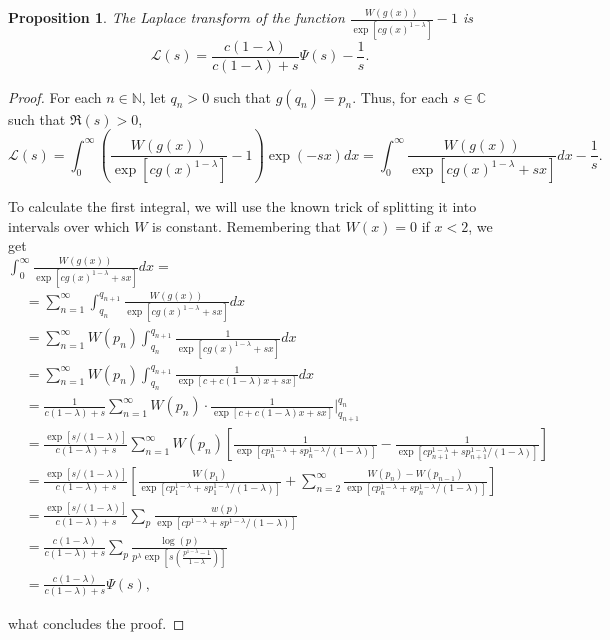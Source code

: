 \documentclass[11pt]{amsart}
\newtheorem{proposition}[theorem]{Proposition}
\numberwithin{equation}{section}
\newcommand{\N}{\mathbb{N}}
\newcommand{\C}{\mathbb{C}}
\newcommand{\disum}{\displaystyle \sum}
\newcommand{\diint}{\displaystyle \int}
\newcommand{\difrac}{\displaystyle \frac}
\begin{document}
\begin{proposition}

The Laplace transform of the function $\difrac{W(g(x))}{\exp[cg(x)^{1 - \lambda}]} -1$ is $$\mathscr{L}(s) = \difrac{c(1 - \lambda)}{c(1 - \lambda) + s}\Psi(s) - \difrac{1}{s}.$$

\end{proposition}

\begin{proof} For each $n \in \N$, let $q_n > 0$ such that $g(q_n) = p_n$. Thus, for each $s \in \C$ such that $\Re(s) > 0$, $$\mathscr{L}(s) = \diint_{0}^{\infty} \left(\difrac{W(g(x))}{\exp[cg(x)^{1 - \lambda}]} -1\right) \exp(-sx) dx = \diint_{0}^{\infty} \difrac{W(g(x))}{\exp[cg(x)^{1 - \lambda} + sx]} dx - \difrac{1}{s}.$$

To calculate the first integral, we will use the known trick of splitting it into intervals over which $W$ is constant. Remembering that $W(x) = 0$ if $x < 2$, we get \\ $\diint_{0}^{\infty} \difrac{W(g(x))}{\exp[cg(x)^{1 - \lambda} + sx]} dx =$ \begin{equation*} \begin{split} {} & = \disum_{n = 1}^{\infty} \diint_{q_n}^{q_{n+1}} \difrac{W(g(x))}{\exp[cg(x)^{1 - \lambda} + sx]} dx \\ & = \disum_{n = 1}^{\infty} W(p_n) \diint_{q_n}^{q_{n+1}} \difrac{1}{\exp[cg(x)^{1 - \lambda} + sx]} dx \\ & = \disum_{n = 1}^{\infty} W(p_n) \diint_{q_n}^{q_{n+1}} \difrac{1}{\exp[c + c(1 - \lambda)x + sx]} dx \\ & = \difrac{1}{c(1 - \lambda) + s} \disum_{n = 1}^{\infty} W(p_n) \cdot \difrac{1}{\exp[c + c(1 - \lambda)x + sx]} \bigg|_{q_{n+1}}^{q_n} \\ & = \difrac{\exp[s/(1 - \lambda)]}{c(1 - \lambda) + s} \disum_{n = 1}^{\infty} W(p_n) \left[\difrac{1}{\exp[cp_n^{1 - \lambda} + sp_n^{1 - \lambda}/(1 - \lambda)]} - \difrac{1}{\exp[cp_{n + 1}^{1 - \lambda} + sp_{n + 1}^{1 - \lambda}/(1 - \lambda)]} \right] \\ & = \difrac{\exp[s/(1 - \lambda)]}{c(1 - \lambda) + s}\left[\difrac{W(p_1)}{\exp[cp_1^{1 - \lambda} + sp_1^{1 - \lambda}/(1 - \lambda)]} + \disum_{n = 2}^{\infty} \difrac{W(p_n) - W(p_{n - 1})}{\exp[cp_n^{1 - \lambda} + sp_n^{1 - \lambda}/(1 - \lambda)]} \right] \\ & = \difrac{\exp[s/(1 - \lambda)]}{c(1 - \lambda) + s}\disum_p \difrac{w(p)}{\exp[cp^{1 - \lambda} + sp^{1 - \lambda}/(1 - \lambda)]} \\ & = \difrac{c(1 - \lambda)}{c(1 - \lambda) + s} \disum_p \difrac{\log(p)}{p^{\lambda}\exp\left[s \left(\difrac{p^{1 - \lambda} - 1}{1 - \lambda}\right)\right]} \\ & = \difrac{c(1 - \lambda)}{c(1 - \lambda) + s}\Psi(s), \end{split} \end{equation*}

\noindent what concludes the proof. \end{proof}
\end{document}

